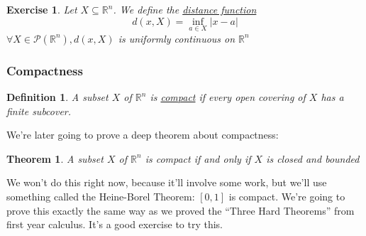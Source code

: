 \documentclass{article}
\newtheorem{theorem}{Theorem}
\newtheorem{definition}{Definition}
\newtheorem{exercise}{Exercise}
\newcommand{\reals}[0]{\mathbb{R}}
\newcommand{\mc}[1]{\mathcal{#1}}
\begin{document}
\begin{exercise}
  Let \(X \subseteq \reals^n\). We define the \underline{distance function}
  \begin{equation}d(x, X) = \inf_{a \in X}|x - a|\end{equation}
  \(\forall X \in \mc{P}(\reals^n), d(x, X)\) is uniformly continuous on \(\reals^n\)
\end{exercise}


\subsubsection{Compactness}


\begin{definition}
  A subset \(X\) of \(\reals^n\) is \underline{compact} if every open covering of \(X\) has a finite subcover.
\end{definition}

We're later going to prove a deep theorem about compactness:
\begin{theorem}
  A subset \(X\) of \(\reals^n\) is compact if and only if \(X\) is closed and bounded
\end{theorem}
We won't do this right now, because it'll involve some work, but we'll use something called the Heine-Borel Theorem: \([0, 1]\) is compact. We're going to prove this exactly the same way as we proved the ``Three Hard Theorems'' from first year calculus. It's a good exercise to try this.
\end{document}
